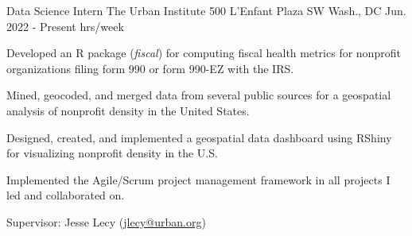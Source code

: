 



\begin{cventries}

  \cventry
    {Data Science Intern} %
    {The Urban Institute} %
    {500 L'Enfant Plaza SW
    Wash., DC} %
    {Jun. 2022 - Present  hrs/week} %
    {
      \begin{cvitems} %
        \item {Developed an R package (\textit{fiscal}) for computing fiscal health metrics for nonprofit organizations filing form 990 or form 990-EZ with the IRS.}
        \item {Mined, geocoded, and merged data from several public sources for a geospatial analysis of nonprofit density in the United States.}
        \item {Designed, created, and implemented a geospatial data dashboard using RShiny for visualizing nonprofit density in the U.S.}
        \item {Implemented the Agile/Scrum project management framework in all projects I led and collaborated on.}
        \item {Supervisor: Jesse Lecy (\textcolor{navyblue}{\underline{\href{mailto:jlecy@urban.org}{jlecy@urban.org}}})}
      \end{cvitems}
    }



\end{cventries}

